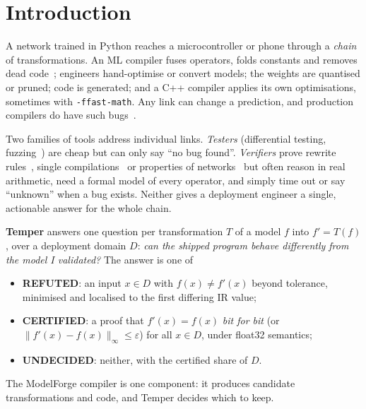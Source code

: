 \documentclass[conference]{IEEEtran}
\begin{document}
\section{Introduction}
A network trained in Python reaches a microcontroller or phone through a \emph{chain} of transformations. An ML compiler fuses operators, folds constants and removes dead code~\cite{tvm,glow}; engineers hand-optimise or convert models; the weights are quantised or pruned; code is generated; and a C++ compiler applies its own optimisations, sometimes with \texttt{-ffast-math}. Any link can change a prediction, and production compilers do have such bugs~\cite{nnsmith}.

Two families of tools address individual links. \emph{Testers} (differential testing, fuzzing~\cite{nnsmith,diffchaser}) are cheap but can only say ``no bug found''. \emph{Verifiers} prove rewrite rules~\cite{tensorright}, single compilations~\cite{pnueli,necula,alive2} or properties of networks~\cite{reluplex,deeppoly,reludiff} but often reason in real arithmetic, need a formal model of every operator, and simply time out or say ``unknown'' when a bug exists. Neither gives a deployment engineer a single, actionable answer for the whole chain.

\textbf{Temper} answers one question per transformation $T$ of a model $f$ into $f'=T(f)$, over a deployment domain $D$: \emph{can the shipped program behave differently from the model I validated?} The answer is one of
\begin{itemize}
\item \textbf{REFUTED}: an input $x\in D$ with $f(x)\ne f'(x)$ beyond tolerance, minimised and localised to the first differing IR value;
\item \textbf{CERTIFIED}: a proof that $f'(x)=f(x)$ \emph{bit for bit} (or $\|f'(x)-f(x)\|_\infty\le\varepsilon$) for all $x\in D$, under float32 semantics;
\item \textbf{UNDECIDED}: neither, with the certified share of $D$.
\end{itemize}
The ModelForge compiler is one component: it produces candidate transformations and code, and Temper decides which to keep.
\end{document}
